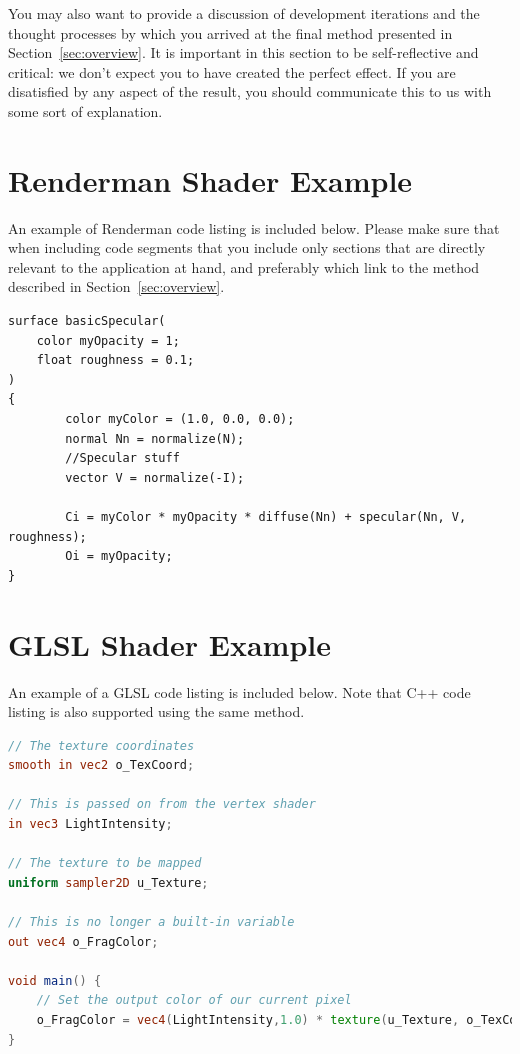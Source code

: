 \documentclass[]{acmsiggraph}
\begin{document}
You may also want to provide a discussion of development iterations and the thought processes by which you arrived at the final method presented in Section~\ref{sec:overview}. It is important in this section to be self-reflective and critical: we don't expect you to have created the perfect effect. If you are disatisfied by any aspect of the result, you should communicate this to us with some sort of explanation.




\newpage
\appendix
\section{Renderman Shader Example}\label{app:renderman}
An example of Renderman code listing is included below. Please make sure that when including code segments that you include only sections that are directly relevant to the application at hand, and preferably which link to the method described in Section~\ref{sec:overview}.
\begin{lstlisting}[language=rendermansl, label={lst:renderman}, caption={Renderman example lifted from \protect\cite{renderman16}.}]
surface basicSpecular(
    color myOpacity = 1;
    float roughness = 0.1;
)
{
        color myColor = (1.0, 0.0, 0.0);
        normal Nn = normalize(N);
        //Specular stuff
        vector V = normalize(-I);

        Ci = myColor * myOpacity * diffuse(Nn) + specular(Nn, V, roughness);
        Oi = myOpacity;
}
\end{lstlisting}


\section{GLSL Shader Example}\label{app:glsl}
An example of a GLSL code listing is included below. Note that C++ code listing is also supported using the same method.

\begin{lstlisting}[language=GLSL, label={lst:glsl}, caption={A simple textured shader.}]
// The texture coordinates
smooth in vec2 o_TexCoord;

// This is passed on from the vertex shader
in vec3 LightIntensity;

// The texture to be mapped
uniform sampler2D u_Texture;

// This is no longer a built-in variable
out vec4 o_FragColor;

void main() {
    // Set the output color of our current pixel
    o_FragColor = vec4(LightIntensity,1.0) * texture(u_Texture, o_TexCoord);
}
\end{lstlisting}
\end{document}
